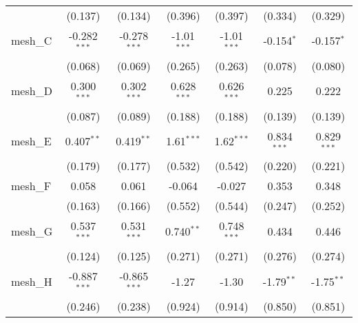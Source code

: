 \begin{tabular}{lcccccc}
                                                               & (0.137)        & (0.134)        & (0.396)        & (0.397)        & (0.334)        & (0.329)\\   
   mesh\_C                                                     & -0.282$^{***}$ & -0.278$^{***}$ & -1.01$^{***}$  & -1.01$^{***}$  & -0.154$^{*}$   & -0.157$^{*}$\\   
                                                               & (0.068)        & (0.069)        & (0.265)        & (0.263)        & (0.078)        & (0.080)\\   
   mesh\_D                                                     & 0.300$^{***}$  & 0.302$^{***}$  & 0.628$^{***}$  & 0.626$^{***}$  & 0.225          & 0.222\\   
                                                               & (0.087)        & (0.089)        & (0.188)        & (0.188)        & (0.139)        & (0.139)\\   
   mesh\_E                                                     & 0.407$^{**}$   & 0.419$^{**}$   & 1.61$^{***}$   & 1.62$^{***}$   & 0.834$^{***}$  & 0.829$^{***}$\\   
                                                               & (0.179)        & (0.177)        & (0.532)        & (0.542)        & (0.220)        & (0.221)\\   
   mesh\_F                                                     & 0.058          & 0.061          & -0.064         & -0.027         & 0.353          & 0.348\\   
                                                               & (0.163)        & (0.166)        & (0.552)        & (0.544)        & (0.247)        & (0.252)\\   
   mesh\_G                                                     & 0.537$^{***}$  & 0.531$^{***}$  & 0.740$^{**}$   & 0.748$^{***}$  & 0.434          & 0.446\\   
                                                               & (0.124)        & (0.125)        & (0.271)        & (0.271)        & (0.276)        & (0.274)\\   
   mesh\_H                                                     & -0.887$^{***}$ & -0.865$^{***}$ & -1.27          & -1.30          & -1.79$^{**}$   & -1.75$^{**}$\\   
                                                               & (0.246)        & (0.238)        & (0.924)        & (0.914)        & (0.850)        & (0.851)\\   

\end{tabular}
